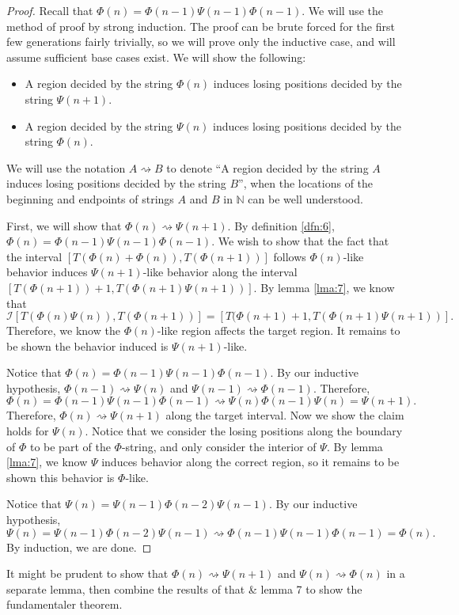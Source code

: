 \documentclass[11pt, letterpaper]{article}
\begin{document}
\begin{proof}
	Recall that $\Phi (n)=\Phi (n-1)\Psi (n-1)\Phi (n-1)$. We will use the method of proof by strong induction. The proof can be brute forced for the first few generations fairly trivially, so we will prove only the inductive case, and will assume sufficient base cases exist. We will show the following:
	\begin{itemize}
		\item A region decided by the string $\Phi (n)$ induces losing positions decided by the string $\Psi (n+1)$.
		\item A region decided by the string $\Psi (n)$ induces losing positions decided by the string $\Phi (n)$.
	\end{itemize}
	We will use the notation $A\rightsquigarrow B$ to denote ``A region decided by the string $A$ induces losing positions decided by the string $B$'', when the locations of the beginning and endpoints of strings $A$ and $B$ in $\mathbb{N}$ can be well understood.

	First, we will show that $\Phi (n)\rightsquigarrow \Psi (n+1)$. By definition \ref{dfn:6}, $\Phi (n)=\Phi (n-1)\Psi (n-1)\Phi (n-1)$. We wish to show that the fact that the interval $[T(\Phi (n)+\Phi (n)),T(\Phi (n+1))]$ follows $\Phi(n) $-like behavior induces $\Psi(n+1) $-like behavior along the interval $[T(\Phi (n+1))+1,T(\Phi (n+1)\Psi (n+1))]$. By lemma \ref{lma:7}, we know that
	\[
		\mathcal{I} \left[ T(\Phi (n)\Psi (n)),T(\Phi (n+1)) \right] =\left[ T(\Phi (n+1)+1,T(\Phi (n+1)\Psi (n+1)) \right] 
	.\]
	Therefore, we know the $\Phi(n) $-like region affects the target region. It remains to be shown the behavior induced is $\Psi(n+1) $-like.

	Notice that $\Phi (n)=\Phi (n-1)\Psi (n-1)\Phi (n-1)$. By our inductive hypothesis, $\Phi (n-1)\rightsquigarrow \Psi (n)$ and $\Psi (n-1)\rightsquigarrow \Phi (n-1)$. Therefore,
	\[
	\Phi (n)=\Phi (n-1)\Psi (n-1)\Phi (n-1)\rightsquigarrow \Psi (n)\Phi (n-1)\Psi(n)=\Psi(n+1)
	.\]
	Therefore, $\Phi (n)\rightsquigarrow \Psi (n+1)$ along the target interval. Now we show the claim holds for $\Psi (n)$. Notice that we consider the losing positions along the boundary of $\Phi $ to be part of the $\Phi $-string, and only consider the interior of $\Psi $. By lemma \ref{lma:7}, we know $\Psi $ induces behavior along the correct region, so it remains to be shown this behavior is $\Phi $-like.

	Notice that $\Psi (n)=\Psi (n-1)\Phi (n-2)\Psi (n-1)$. By our inductive hypothesis,
	\[
		\Psi (n)=\Psi (n-1)\Phi (n-2)\Psi (n-1)\rightsquigarrow \Phi (n-1)\Psi (n-1)\Phi (n-1)=\Phi (n)
	.\]
	By induction, we are done.
\end{proof}
\begin{note}
	It might be prudent to show that $\Phi(n)\rightsquigarrow \Psi (n+1)$ and $\Psi (n)\rightsquigarrow \Phi (n)$ in a separate lemma, then combine the results of that \& lemma 7 to show the fundamentaler theorem.
\end{note}
\end{document}
